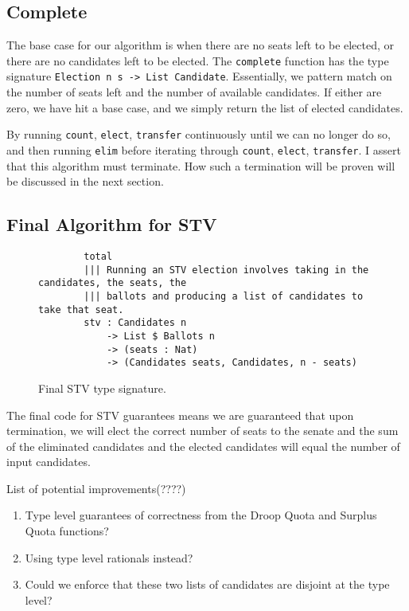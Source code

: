 \subsection{Complete}
The base case for our algorithm is when there are no seats left to be elected,
or there are no candidates left to be elected. The \texttt{complete} function
has the type signature \texttt{Election n s -> List Candidate}. Essentially, we
pattern match on the number of seats left and the number of available
candidates. If either are zero, we have hit a base case, and we simply return
the list of elected candidates. 

By running \texttt{count}, \texttt{elect}, \texttt{transfer} continuously until
we can no longer do so, and then running \texttt{elim} before iterating through
\texttt{count}, \texttt{elect}, \texttt{transfer}. I assert that this algorithm
must terminate. How such a termination will be proven will be discussed in the
next section.

\subsection{Final Algorithm for STV}

\begin{figure}[ht!!!!!!!]
    \caption{Final STV type signature. }
    \label{stv_idris}
    \begin{lstlisting}
        total
        ||| Running an STV election involves taking in the candidates, the seats, the
        ||| ballots and producing a list of candidates to take that seat. 
        stv : Candidates n 
            -> List $ Ballots n 
            -> (seats : Nat) 
            -> (Candidates seats, Candidates, n - seats)
    \end{lstlisting}
\end{figure}

The final code for STV guarantees means we are guaranteed that upon termination,
we will elect the correct number of seats to the senate and the sum of the
eliminated candidates and the elected candidates will equal the number of input
candidates. 

List of potential improvements(????)
\begin{enumerate}
    \item Type level guarantees of correctness from the Droop Quota and Surplus Quota functions?
    \item Using type level rationals instead?
    \item Could we enforce that these two lists of candidates are disjoint at the type level?
\end{enumerate}